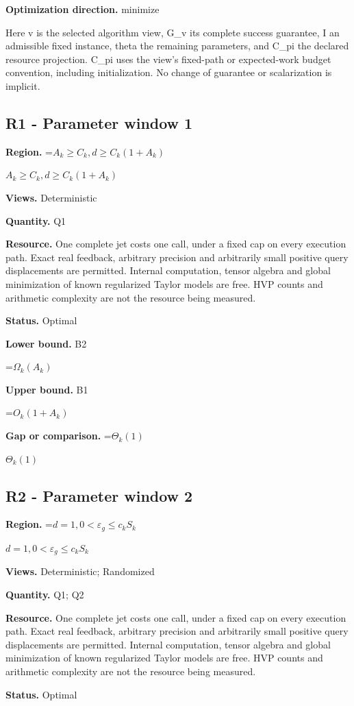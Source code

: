 \documentclass[10pt,a4paper]{article}
\newcommand{\AtlasMath}[1]{\par\begingroup\centering\setbox0=\hbox{$\displaystyle #1$}\ifdim\wd0>1.4\linewidth\typeout{ATLAS WIDE FORMULA: \the\wd0}\fi\ifdim\wd0>\linewidth\resizebox{\linewidth}{!}{\box0}\else\box0\fi\par\endgroup}
\newcommand{\AtlasInlineMath}[1]{\begingroup\setbox0=\hbox{$#1$}\ifdim\wd0>.4\linewidth\endgroup\AtlasMath{#1}\else\endgroup$#1$\fi}
\begin{document}
\textbf{Optimization direction.} minimize

Here v is the selected algorithm view, G\_v its complete success guarantee, I an admissible fixed instance, theta the remaining parameters, and C\_pi the declared resource projection. C\_pi uses the view's fixed-path or expected-work budget convention, including initialization. No change of guarantee or scalarization is implicit.

\subsection{R1 - Parameter window 1}
\textbf{Region.} \AtlasInlineMath{A_k\ge C_k, d\ge C_k(1+A_k)}

\textbf{Views.} Deterministic

\textbf{Quantity.} Q1

\textbf{Resource.} One complete jet costs one call, under a fixed cap on every execution path. Exact real feedback, arbitrary precision and arbitrarily small positive query displacements are permitted. Internal computation, tensor algebra and global minimization of known regularized Taylor models are free. HVP counts and arithmetic complexity are not the resource being measured.

\textbf{Status.} Optimal

\textbf{Lower bound.} B2

\AtlasMath{\Omega_k(A_k)}
\textbf{Upper bound.} B1

\AtlasMath{O_k(1+A_k)}
\textbf{Gap or comparison.} \AtlasInlineMath{\Theta_k(1)}

\subsection{R2 - Parameter window 2}
\textbf{Region.} \AtlasInlineMath{d=1, 0<\varepsilon_g\le c_k S_k}

\textbf{Views.} Deterministic; Randomized

\textbf{Quantity.} Q1; Q2

\textbf{Resource.} One complete jet costs one call, under a fixed cap on every execution path. Exact real feedback, arbitrary precision and arbitrarily small positive query displacements are permitted. Internal computation, tensor algebra and global minimization of known regularized Taylor models are free. HVP counts and arithmetic complexity are not the resource being measured.

\textbf{Status.} Optimal
\end{document}
